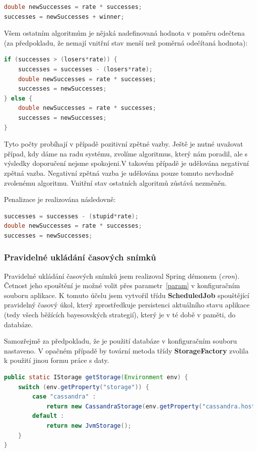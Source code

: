 \documentclass[thesis=M,czech]{FITthesis}[2014/05/07]
\begin{document}
\begin{lstlisting}[language=java]
double newSuccesses = rate * successes;
successes = newSuccesses + winner;
\end{lstlisting}	

Všem ostatním algoritmům je nějaká nadefinovaná hodnota v poměru odečtena (za předpokladu, že nemají vnitřní stav menší než poměrná odečítaná hodnota):

\begin{lstlisting}[language=java]
if (successes > (losers*rate)) {
    successes = successes - (losers*rate);
    double newSuccesses = rate * successes;
    successes = newSuccesses;
} else {
    double newSuccesses = rate * successes;
    successes = newSuccesses;            
}
\end{lstlisting}	

Tyto počty probíhají v případě pozitivní zpětné vazby. Ještě je nutné uvažovat případ, kdy dáme na radu systému, zvolíme algoritmus, který nám poradil, ale s výsledky doporučení nejsme spokojeni.V takovém případě je udělována negativní zpětná vazba. Negativní zpětná vazba je udělována pouze tomuto nevhodně zvolenému algoritmu. Vnitřní stav ostatních algoritmů zůstává nezměněn.

Penalizace je realizována následovně:

\begin{lstlisting}[language=java]
successes = successes - (stupid*rate);
double newSuccesses = rate * successes;
successes = newSuccesses;
\end{lstlisting}	
  
\subsubsection{Pravidelné ukládání časových snímků}
\label{task}
Pravidelné ukládání časových snímků jsem realizoval Spring démonem (\emph{cron}). Četnost jeho spouštění je možné volit přes parametr~\ref{param} v konfiguračním souboru aplikace. K tomuto účelu jsem vytvořil třídu \textbf{ScheduledJob} spouštějící pravidelný časový úkol, který zprostředkuje persistenci aktuálního stavu aplikace (tedy všech běžících bayesovských strategií), který je v té době v paměti, do databáze.

Samozřejmě za předpokladu, že je použití databáze v konfiguračním souboru nastaveno. V opačném případě by tovární metoda třídy \textbf{StorageFactory} zvolila k použití jinou formu práce s daty.

\begin{lstlisting}[language=java]
public static IStorage getStorage(Environment env) {
    switch (env.getProperty("storage")) {
        case "cassandra" : 
            return new CassandraStorage(env.getProperty("cassandra.host"), env.getProperty("cassandra.keyspace"));                
        default : 
            return new JvmStorage();
    }
}
\end{lstlisting}
\end{document}
